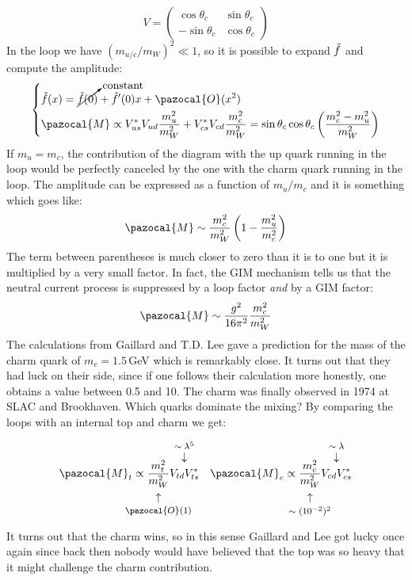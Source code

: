 \documentclass[../main.tex]{subfiles}
\begin{document}
\[
V=\left(\begin{array}{cc}
    \cos\theta_c & \sin\theta_c \\
    -\sin\theta_c & \cos\theta_c
\end{array}\right)
\]
In the loop we have $(m_{u/c}/m_W)^2\ll1$, so it is possible to expand $\Tilde{f}$ and compute the amplitude:
\[
\left\{
\begin{aligned}
&\Tilde{f}(x)=\cancelto{\text{constant}}{\Tilde{f}(0)}+\Tilde{f}'(0)x+\pazocal{O}(x^2)\\
&\pazocal{M}\propto V_{us}^*V_{ud}\frac{m_u^2}{m_W^2}+V_{cs}^*V_{cd}\frac{m_c^2}{m_W^2}=\sin\theta_c\cos\theta_c\left(\frac{m_c^2-m_u^2}{m_W^2}\right)
\end{aligned}
\right.
\]
If $m_u=m_c$, the contribution of the diagram with the up quark running in the loop would be perfectly canceled by the one with the charm quark running in the loop. The amplitude can be expressed as a function of $m_u/m_c$ and it is something which goes like:
\[
\pazocal{M}\sim\frac{m_c^2}{m_W^2}\left(1-\frac{m_u^2}{m_c^2}\right)
\]
The term between parentheses is much closer to zero than it is to one but it is multiplied by a very small factor. In fact, the GIM mechanism tells us that the neutral current process is suppressed by a loop factor \textit{and} by a GIM factor:
\[
\pazocal{M}\sim\frac{g^2}{16\pi^2}\frac{m_c^2}{m_W^2}
\]
The calculations from Gaillard and T.D. Lee gave a prediction for the mass of the charm quark of $m_c=1.5$\,GeV which is remarkably close. It turns out that they had luck on their side, since if one follows their calculation more honestly, one obtains a value between 0.5 and 10. The charm was finally observed in 1974 at SLAC and Brookhaven. Which quarks dominate the mixing? By comparing the loops with an internal top and charm we get:
\[
\pazocal{M}_t\propto\underset{\mathclap{\tikz \node {$\uparrow$} node [below=1ex] {\footnotesize  $\pazocal{O}(1)$};}}{\frac{m_t^2}{m_W^2}}\overset{\mathclap{\tikz \node {$\downarrow$} node [above=1ex] {\footnotesize $\sim\lambda^5$};}}{V_{td}V_{ts}^*} \quad \pazocal{M}_c\propto\underset{\mathclap{\tikz \node {$\uparrow$} node [below=1ex] {\footnotesize  $\sim(10^{-2})^2$};}}{\frac{m_c^2}{m_W^2}}\overset{\mathclap{\tikz \node {$\downarrow$} node [above=1ex] {\footnotesize $\sim\lambda$};}}{V_{cd}V_{cs}^*}
\]
It turns out that the charm wins, so in this sense Gaillard and Lee got lucky once again since back then nobody would have believed that the top was so heavy that it might challenge the charm contribution.
\end{document}
